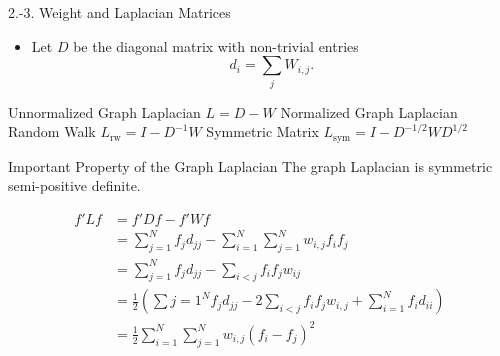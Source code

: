 \documentclass{beamer}
\begin{document}
\begin{frame}{2.-3. Weight and Laplacian Matrices}
    \begin{itemize}
        \item Let $D$ be the diagonal matrix with non-trivial entries 
        $$
        d_{i} = \sum_{j} W_{i, j}.
        $$
    \end{itemize}
    \begin{outline}
     \1 Unnormalized Graph Laplacian
       \2 $L = D - W$
     \1 Normalized Graph Laplacian
         \2 Random Walk
            \3 $L_{\textrm{rw}} = I - D^{-1} W$
         \2  Symmetric Matrix
            \3 $L_{\textrm{sym}} = I -D^{-1/2}WD^{1/2}$
    \end{outline} 
\end{frame}

\begin{frame}{Important Property of the Graph Laplacian}
    The graph Laplacian is symmetric semi-positive definite. 

    \begin{align*}
        f'Lf &= f'Df - f'Wf \\
             &= \sum_{j=1}^N f_j d_{jj} -\sum_{i=1}^N \sum_{j=1}^N w_{i,j} f_i f_j\\
             &= \sum_{j=1}^N f_j d_{jj} -\sum_{i < j} f_i f_j w_{ij} \\
             &= \frac{1}{2} \left( \sum{j=1}^N f_j d_{jj} -2\sum_{i< j}f_{i} f_j w_{i,j} +\sum_{i=1}^N f_i d_{ii}\right) \\
             &= \frac{1}{2} \sum_{i=1}^N \sum_{j=1}^N w_{i,j} (f_i - f_j)^2
    \end{align*}
\end{frame}
\end{document}
